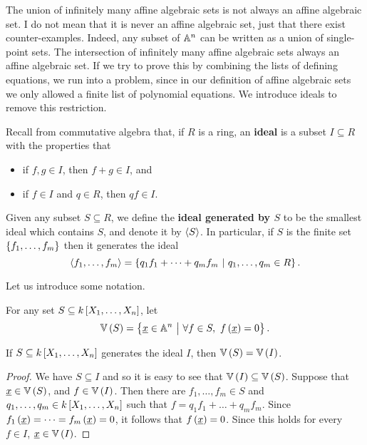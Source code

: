 
The union of infinitely many affine algebraic sets is not always an affine algebraic set. I do not mean that it is never an affine algebraic set, just that there exist counter-examples. Indeed, any subset of $ \AA^n $ can be written as a union of single-point sets. The intersection of infinitely many affine algebraic sets always an affine algebraic set. If we try to prove this by combining the lists of defining equations, we run into a problem, since in our definition of affine algebraic sets we only allowed a finite list of polynomial equations. We introduce ideals to remove this restriction.

\begin{definition*}
Recall from commutative algebra that, if $ R $ is a ring, an \textbf{ideal} is a subset $ I \subseteq R $ with the properties that
\begin{itemize}
\item if $ f, g \in I $, then $ f + g \in I $, and
\item if $ f \in I $ and $ q \in R $, then $ qf \in I $.
\end{itemize}
Given any subset $ S \subseteq R $, we define the \textbf{ideal generated by $ S $} to be the smallest ideal which contains $ S $, and denote it by $ \abr{S} $. In particular, if $ S $ is the finite set $ \cbr{f_1, \dots, f_m} $ then it generates the ideal
$$ \abr{f_1, \dots, f_m} = \cbr{q_1f_1 + \dots + q_mf_m \st q_1, \dots, q_m \in R}. $$
\end{definition*}

Let us introduce some notation.

\begin{definition*}
For any set $ S \subseteq k\sbr{X_1, \dots, X_n} $, let
$$ \VV\br{S} = \cbr{\underline{x} \in \AA^n \st \forall f \in S, \ f\br{\underline{x}} = 0}. $$
\end{definition*}

\begin{lemma}
\label{lem:vs}
If $ S \subseteq k\sbr{X_1, \dots, X_n} $ generates the ideal $ I $, then $ \VV\br{S} = \VV\br{I} $.
\end{lemma}

\begin{proof}
We have $ S \subseteq I $ and so it is easy to see that $ \VV\br{I} \subseteq \VV\br{S} $. Suppose that $ \underline{x} \in \VV\br{S} $, and $ f \in \VV\br{I} $. Then there are $ f_1, \dots, f_m \in S $ and $ q_1, \dots, q_m \in k\sbr{X_1, \dots, X_n} $ such that $ f = q_1f_1 + \dots + q_mf_m $. Since $ f_1\br{\underline{x}} = \dots = f_m\br{\underline{x}} = 0 $, it follows that $ f\br{\underline{x}} = 0 $. Since this holds for every $ f \in I $, $ \underline{x} \in \VV\br{I} $.
\end{proof}

